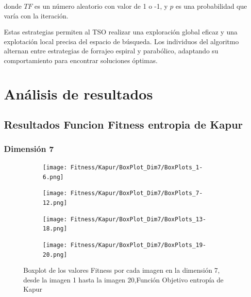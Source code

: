 \documentclass[conference]{IEEEtran}
\begin{document}
\noindent donde $TF$ es un número aleatorio con valor de 1 o -1, y $p$ es una probabilidad que varía con la iteración.

\noindent Estas estrategias permiten al TSO realizar una exploración global eficaz y una explotación local precisa del espacio de búsqueda. Los individuos del algoritmo alternan entre estrategias de forrajeo espiral y parabólico, adaptando su comportamiento para encontrar soluciones óptimas.



\section{Análisis de resultados} \label{sec:ce}
\subsection{Resultados Funcion Fitness entropia de Kapur}
\subsubsection{Dimensión 7}
\begin{figure}
	\centering
	
	\begin{subfigure}{0.38\textwidth}
		\texttt{[image: Fitness/Kapur/BoxPlot\_Dim7/BoxPlots\_1-6.png]}
	\end{subfigure}
	
	\begin{subfigure}{0.38\textwidth}
		\texttt{[image: Fitness/Kapur/BoxPlot\_Dim7/BoxPlots\_7-12.png]}
	\end{subfigure}
	\begin{subfigure}{0.38\textwidth}
		\texttt{[image: Fitness/Kapur/BoxPlot\_Dim7/BoxPlots\_13-18.png]}
	\end{subfigure}
	\begin{subfigure}{0.38\textwidth}
		\texttt{[image: Fitness/Kapur/BoxPlot\_Dim7/BoxPlots\_19-20.png]}
		\vspace{-120pt} %
	\end{subfigure}
	\caption{Boxplot de los valores Fitness por cada imagen en la dimensión 7, desde la imagen 1 hasta la imagen 20,Función Objetivo entropía de Kapur}
	\label{fig:Boxplot_Fitnes_Dim7_Kapur}    
\end{figure}
\end{document}
